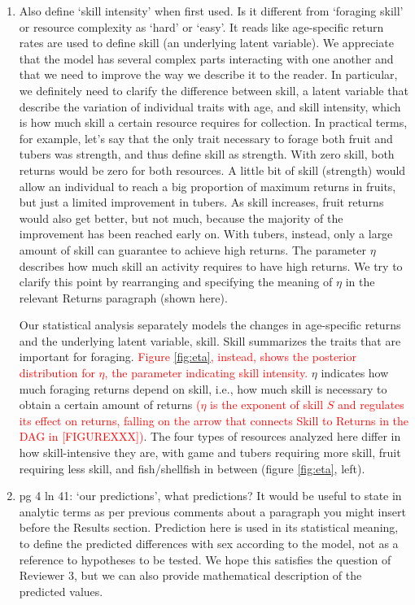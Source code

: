 \documentclass{article}
\newcommand{\rev}[1]{{\color{ForestGreen}#1}}
\begin{document}
\begin{enumerate}
    \item Also define ‘skill intensity’ when first used. Is it different from ‘foraging skill’ or resource complexity as ‘hard’ or ‘easy’. It reads like age-specific return rates are used to define skill (an underlying latent variable).
    \rev{We appreciate that the model has several complex parts interacting with one another and that we need to improve the way we describe it to the reader. In particular, we definitely need to clarify the difference between skill, a latent variable that describe the variation of individual traits with age, and skill intensity, which is how much skill a certain resource requires for collection. In practical terms, for example, let's say that the only trait necessary to forage both fruit and tubers was strength, and thus define skill as strength. With zero skill, both returns would be zero for both resources. A little bit of skill (strength) would allow an individual to reach a big proportion of maximum returns in fruits, but just a limited improvement in tubers. As skill increases, fruit returns would also get better, but not much, because the majority of the improvement has been reached early on. With tubers, instead, only a large amount of skill can guarantee to achieve high returns. The parameter $\eta$ describes how much skill an activity requires to have high returns. We try to clarify this point by rearranging and specifying the meaning of $\eta$ in the relevant Returns paragraph (shown here).   }
    \begin{displayquote}
    Our statistical analysis separately models the changes in age-specific returns and the underlying latent variable, skill. Skill summarizes the traits that are important for foraging. \textcolor{red}{Figure \ref{fig:eta}, instead, shows the posterior distribution for $\eta$, the parameter indicating skill intensity.} $\eta$ indicates how much foraging returns depend on skill, i.e., how much skill is necessary to obtain a certain amount of returns \textcolor{red}{($\eta$ is the exponent of skill $S$ and regulates its effect on returns, falling on the arrow that connects Skill to Returns in the DAG in [FIGUREXXX])}. The four types of resources analyzed here differ in how skill-intensive they are, with game and tubers requiring more skill, fruit requiring less skill, and fish/shellfish in between (figure \ref{fig:eta}, left). 
    \end{displayquote}
    
    \item pg 4 ln 41: ‘our predictions’, what predictions? It would be useful to state in analytic terms as per previous comments about a paragraph you might insert before the Results section.
    \rev{Prediction here is used in its statistical meaning, to define the predicted differences with sex according to the model, not as a reference to hypotheses to be tested. We hope this satisfies the question of Reviewer 3, but we can also provide mathematical description of the predicted values.  }
    

\end{enumerate}
\end{document}
